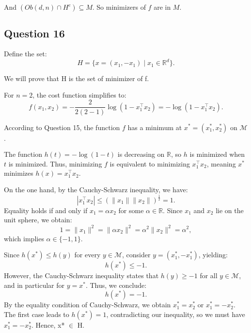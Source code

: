 \documentclass{article}
\begin{document}
And \( (Ob(d,n) \cap H^c) \subseteq M \). So minimizers of \( f \) are in \( M \).


\subsection*{Question 16}
Define the set:
\begin{equation}
    H = \{ x = (x_1, -x_1) \mid x_1 \in \mathbb{R}^d \}.
\end{equation}

We will prove that H is the set of minimizer of f.


For \( n = 2 \), the cost function simplifies to:  
\[
f(x_1, x_2) = -\frac{2}{2(2-1)} \log(1 - x_1^\top x_2) = -\log(1 - x_1^\top x_2).
\]



According to Question 15, the function $f$ has a minimum at $x^* = (x_1^*, x_2^*)$ on $\mathcal{M}$. 

The function $h(t) = -\log(1 - t)$ is decreasing on $\mathbb{R}$, so $h$ is minimized when $t$ is minimized. Thus, minimizing $f$ is equivalent to minimizing $x_1^\top x_2$, meaning $x^*$ minimizes $h(x) = x_1^\top x_2$.

On the one hand, by the Cauchy-Schwarz inequality, we have:
\begin{equation}
    |x_1^\top x_2| \leq (\|x_1\| \|x_2\|)^{\frac{1}{2}} = 1.
\end{equation}
Equality holds if and only if $x_1 = \alpha x_2$ for some $\alpha \in \mathbb{R}$. Since $x_1$ and $x_2$ lie on the unit sphere, we obtain:
\begin{equation}
    1 = \|x_1\|^2 = \|\alpha x_2\|^2 = \alpha^2 \|x_2\|^2 = \alpha^2,
\end{equation}
which implies $\alpha \in \{-1,1\}$.

Since $h(x^*) \leq h(y)$ for every $y \in \mathcal{M}$, consider $y = (x_1^*, -x_1^*)$, yielding:
\begin{equation}
    h(x^*) \leq -1.
\end{equation}
However, the Cauchy-Schwarz inequality states that $h(y) \geq -1$ for all $y \in \mathcal{M}$, and in particular for $y = x^*$. Thus, we conclude:
\begin{equation}
    h(x^*) = -1.
\end{equation}
By the equality condition of Cauchy-Schwarz, we obtain $x_1^* = x_2^*$ or $x_1^* = -x_2^*$. The first case leads to $h(x^*) = 1$, contradicting our inequality, so we must have $x_1^* = -x_2^*$. 
Hence, x* $\in$ H. 
\end{document}

